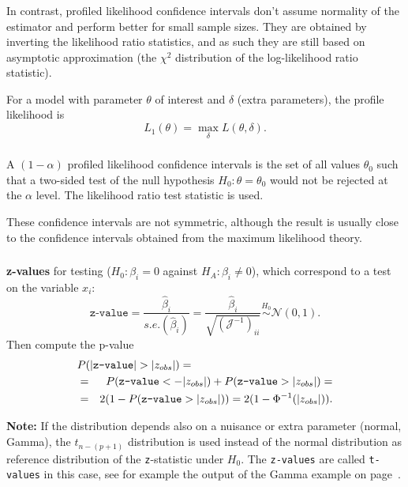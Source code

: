 \documentclass{beamer}
\newcommand{\bs}{\bigskip}
\begin{document}
\begin{frame}
\frametitle{}
In contrast, {\color{blue}profiled likelihood confidence intervals} don't assume
normality of the estimator and perform better for small sample sizes. They are
obtained by inverting the likelihood  ratio statistics, and as such they are
still based on asymptotic approximation (the $\chi^2$ distribution of the
log-likelihood ratio statistic). 

\bs
For a model with parameter $\theta$ of interest and $\delta$ (extra parameters),
the profile likelihood is 
$$L_1(\theta) = \max_{\delta} L(\theta,\delta).$$
\end{frame}


\begin{frame}
\frametitle{}
A $(1-\alpha)$ profiled likelihood confidence intervals is the set of all values
$\theta_0$ such that a two-sided test of the null hypothesis $H_0: \theta =
\theta_0$ would not be rejected at the $\alpha$ level. The likelihood ratio test
statistic is used.

\bs
These confidence intervals are not symmetric, although the result is usually
close to the confidence intervals obtained from the maximum likelihood theory.
\end{frame}


\begin{frame}
\frametitle{}
\textbf{z-values} for testing ($H_0: \beta_i=0$ against $H_A: \beta_i \neq
0$), which  correspond to a test on the variable $x_i$:
$$\texttt{z-value} = \frac{\hat{\beta}_i}{s.e.(\hat{\beta}_i)} =
\frac{\hat{\beta}_i}{\sqrt{({\mathcal J}^{-1})_{ii}}} \stackrel{H_0}{\sim} {\mathcal
  N}(0,1).$$
Then compute the p-value
\begin{eqnarray*}
\lefteqn{P(|\texttt{z-value}| > |z_{obs}|) = \hspace*{3cm}}\\
& = & P(\texttt{z-value} < - |z_{obs}|) + P(\texttt{z-value} > |z_{obs}|) =\\
& = & 2 (1-P(\texttt{z-value} > |z_{obs}|)) =2 ( 1 - \Phi^{-1}(|z_{obs}|)).
\end{eqnarray*}

\bs
\textbf{Note:} If the distribution depends also on a nuisance or extra
parameter (normal, Gamma), the $t_{n-(p+1)}$ distribution is used instead of the
normal distribution as reference distribution of the \texttt{z}-statistic under $H_0$. The \texttt{z-values} are called
\texttt{t-values} in this case, see for example the output of the Gamma example
on page~\pageref{Routput.gamma}.
\end{frame}
\end{document}
